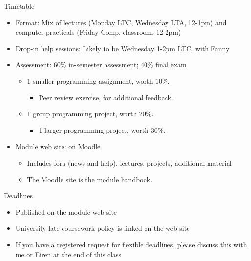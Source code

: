 \documentclass[ignorenonframetext,]{beamer}
\providecommand{\tightlist}{%
  \setlength{\itemsep}{0pt}\setlength{\parskip}{0pt}}
\begin{document}
\begin{frame}{Timetable}

\begin{itemize}[<+->]
\tightlist
\item
  Format: Mix of lectures (Monday LTC, Wednesday LTA, 12-1pm) and
  computer practicals (Friday Comp. classroom, 12-2pm)
\item
  Drop-in help sessions: Likely to be Wednesday 1-2pm LTC, with Fanny
\item
  Assessment: 60\% in-semester assessment; 40\% final exam

  \begin{itemize}[<+->]
  \tightlist
  \item
    1 smaller programming assignment, worth 10\%.

    \begin{itemize}[<+->]
    \tightlist
    \item
      Peer review exercise, for additional feedback.
    \end{itemize}
  \item
    1 group programming project, worth 20\%.

    \begin{itemize}[<+->]
    \tightlist
    \item
      1 larger programming project, worth 30\%.
    \end{itemize}
  \end{itemize}
\item
  Module web site: on Moodle

  \begin{itemize}[<+->]
  \tightlist
  \item
    Includes fora (news and help), lectures, projects, additional
    material
  \item
    The Moodle site is the module handbook.
  \end{itemize}
\end{itemize}

\end{frame}

\begin{frame}{Deadlines}

\begin{itemize}[<+->]
\tightlist
\item
  Published on the module web site
\item
  University late coursework policy is linked on the web site
\item
  If you have a registered request for flexible deadlines, please
  discuss this with me or Eiren at the end of this class
\end{itemize}

\end{frame}
\end{document}
